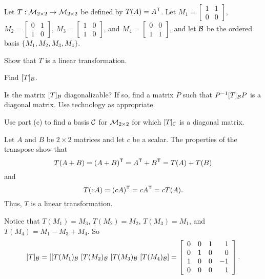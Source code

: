 \begin{example} Let $T : \mathcal{M}_{2 \times 2} \to \mathcal{M}_{2 \times 2}$ be defined by $T(A) = A^{\mathsf{T}}$. Let $M_1 = \left[ \begin{array}{cc} 1&1\\0&0 \end{array} \right]$, $M_2 = \left[ \begin{array}{cc} 0&1\\1&0 \end{array} \right]$, $M_3 = \left[ \begin{array}{cc} 1&0\\1&0 \end{array} \right]$, and $M_4 = \left[ \begin{array}{cc} 0&0\\1&1 \end{array} \right]$, and let $\mathcal{B}$ be the ordered basis  $\{M_1, M_2, M_3, M_4\}$. 
\ba
\item Show that $T$ is a linear transformation.

\item Find $[T]_{\mathcal{B}}$. 

\item Is the matrix $[T]_{\mathcal{B}}$ diagonalizable? If so, find a matrix $P$ such that $P^{-1}[T]_{\mathcal{B}}P$ is a diagonal matrix. Use technology as appropriate. 

\item Use part (c) to find a basis $\mathcal{C}$ for $\mathcal{M}_{2 \times 2}$ for which $[T]_{\mathcal{C}}$ is a diagonal matrix. 


\ea

\ExampleSolution

\end{example}

\ba

\item Let $A$ and $B$ be $2 \times 2$ matrices and let $c$ be a scalar. The properties of the transpose show that 
\[T(A+B) = (A+B)^{\mathsf{T}} = A^{\mathsf{T}}+B^{\mathsf{T}} = T(A) + T(B)\]
and
\[T(cA) = (cA)^{\mathsf{T}} = cA^{\mathsf{T}} = cT(A).\]
Thus, $T$ is a linear transformation. 
 

\item Notice that $T(M_1) = M_3$, $T(M_2) = M_2$, $T(M_3) = M_1$, and $T(M_4) = M_1-M_3+M_4$. So
\[[T]_{\mathcal{B}} = \left[ [T(M_1)_{\mathcal{B}} \  [T(M_2)_{\mathcal{B}} \  [T(M_3)_{\mathcal{B}} \  [T(M_4)_{\mathcal{B}} \right] = \left[ \begin{array}{cccr} 0&0&1&1 \\ 0&1&0&0 \\ 1&0&0&-1  \\ 0&0&0&1  \end{array} \right].\]

